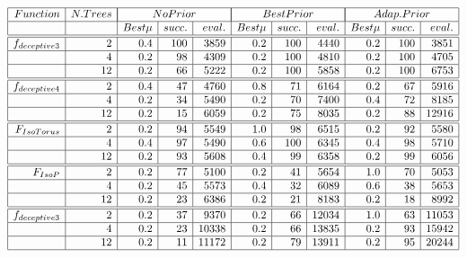 \documentclass[runningheads]{llncs}
\begin{document}
\begin{table}[htbp ]
  \begin{center} 
   \caption{Results of the MT-FDA with different number of  components in the optimization of
    different functions  $n=36$, $T=0.15$ when the number of trees is increased}
   $\begin{array}{|r|r|r|r|r|r|r|r|r|r|r|}
\hline
  Function & N.Trees  &     \multicolumn{3}{|c|}{No Prior}  &  \multicolumn{3}{|c|}{Best Prior} &
      \multicolumn{3}{|c|}{Adap. Prior}  \\ \hline        
        &    & Best \mu     & succ.   & eval. & Best \mu & succ.  & eval. & Best \mu & succ.  & eval. \\ \hline \hline
 f_{deceptive3}& 2  & 0.4 &  100   & 3859  & 0.2  & 100 & 4440  & 0.2  &100  & 3851  \\ \hline
               & 4  & 0.2 &  98    & 4309  & 0.2  & 100   & 4810 &  0.2 & 100 & 4705      \\ \hline
               &12  & 0.2 &  66    & 5222  & 0.2  & 100   & 5858 &  0.2 & 100 & 6753 \\ \hline\hline
 f_{deceptive4} & 2  & 0.4 & 47 & 4760 & 0.8  & 71  & 6164 & 0.2 & 67 & 5916 \\ \hline
               & 4  & 0.2 &  34 &  5490 & 0.2  & 70 & 7400 & 0.4 & 72 & 8185     \\ \hline
               & 12 & 0.2 &  15 &  6059 & 0.2  & 75 & 8035 & 0.2 & 88 & 12916   \\   \hline \hline
 F_{IsoTorus}  & 2  & 0.2 & 94     & 5549 & 1.0 & 98 & 6515  & 0.2 & 92  &   5580    \\ \hline
               & 4  & 0.4 & 97     & 5490 & 0.6 & 100& 6345  & 0.4 & 98  &   5710  \\ \hline
               & 12 & 0.2 & 93     & 5608 & 0.4 & 99 & 6358  & 0.2 & 99  &   6056\\ \hline \hline
 F_{IsoP}      & 2  & 0.2 & 77     & 5100 & 0.2  &  41  &5654 & 1.0 &  70 & 5053      \\ \hline
               & 4 & 0.2 &  45     & 5573 & 0.4  &  32  &6089 & 0.6 &  38 & 5653   \\ \hline   
               & 12 & 0.2 & 23     & 6386 & 0.2 & 21 & 8183   & 0.2  & 18 & 8992     \\ \hline \hline
 f_{deceptive3}& 2  & 0.2 & 37     & 9370 & 0.2 & 66 & 12034 & 1.0& 63  & 11053       \\ \hline
               & 4 & 0.2 &  23     & 10338 & 0.2  & 66   & 13835     & 0.2 & 93 & 15942       \\ \hline   
               & 12 & 0.2 & 11     & 11172  &0.2  & 79   & 13911    &  0.2 & 95 & 20244    \\ \hline 
\end{array}$
    \label{MT2_4_12FUNCS}  
  \end{center}
 \end{table}
 
\end{document}

